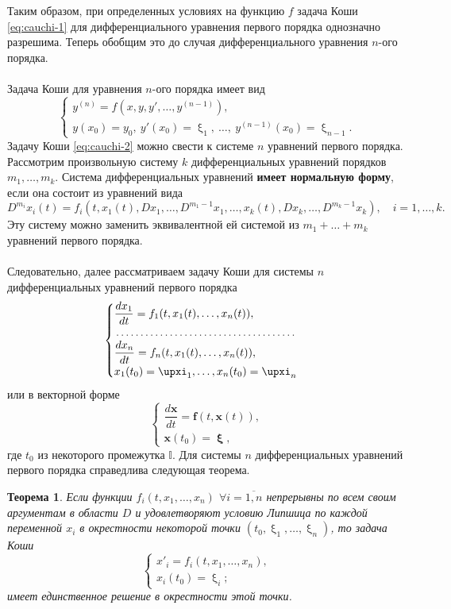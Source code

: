\documentclass[a4paper, 12pt]{report}
\numberwithin{equation}{section}
\renewcommand{\xi}{\upxi}
\newtheorem*{theorem}{Теорема}
\begin{document}
	\noindent
	Таким образом, при определенных условиях на функцию $f$ задача Коши \eqref{eq:cauchi-1} для дифференциального уравнения первого порядка однозначно разрешима.
	Теперь обобщим это до случая дифференциального уравнения $n$-ого порядка.
	\\\\
	Задача Коши для уравнения $n$-ого порядка имеет вид 
	\begin{equation}
		\label{eq:cauchi-2}
		\begin{cases}
			y^{(n)} = f(x, y, y', \ldots, y^{(n-1)}),\\
			y(x_0) = y_0,\ y'(x_0) = \xi_1,\ \ldots,\ y^{(n-1)}(x_0) = \xi_{n-1}.
		\end{cases}
	\end{equation}
	Задачу Коши \eqref{eq:cauchi-2} можно свести к системе $n$ уравнений первого порядка. 
	Рассмотрим произвольную систему $k$ дифференциальных уравнений порядков $m_1,\ldots, m_k$.
	Система дифференциальных уравнений \textbf{имеет нормальную форму}, если она состоит из уравнений вида $$D^{m_i}x_i(t) = f_i(t,x_1(t),Dx_1,\ldots,D^{m_1-1}x_1, \ldots, x_k(t), Dx_k, \ldots, D^{m_k - 1}x_k),\quad i = 1,\ldots, k.$$
	Эту систему можно заменить эквивалентной ей системой из $m_1+\ldots +m_k$ уравнений первого порядка.\\\\
	Следовательно, далее рассматриваем задачу Коши для системы $n$ дифференциальных уравнений первого порядка
	\begin{equation}
		\label{ode-sys}
		\begin{cases}
			\dfrac{dx_1}{dt} = f_1(t, x_1(t),\ldots, x_n(t)),\\
			\dotfill\\
			\dfrac{dx_n}{dt} = f_n(t, x_1(t),\ldots, x_n(t)),\\
			x_1(t_0) =  \xi_1,\ldots, x_n(t_0)=\xi_n
		\end{cases}
	\end{equation}
	или в векторной форме
	\begin{equation}
		\label{cauchi-3}
		\begin{cases}
			\dfrac{d\mathbf x}{dt} = \mathbf f(t,\mathbf x(t)),\\
		\mathbf x(t_0) = \mathbf \xi,
		\end{cases}
	\end{equation}
	где $t_0$ из некоторого промежутка $\mathbb I$.
	Для системы $n$ дифференциальных уравнений первого порядка справедлива следующая теорема.
	\begin{theorem}
		Если функции $f_i(t, x_1, \ldots, x_n)$ $\forall i = \overline{1,n}$ непрерывны по всем своим аргументам в области $D$ и удовлетворяют условию Липшица по каждой переменной $x_i$ в окрестности некоторой точки $(t_0, \xi_1,\ldots, \xi_n)$, то задача Коши $$\begin{cases}
			x'_i = f_i(t, x_1, \ldots, x_n),\\
			x_i (t_0) = \xi_i;
		\end{cases}$$ имеет единственное решение в окрестности этой точки.
	\end{theorem}
\end{document}
